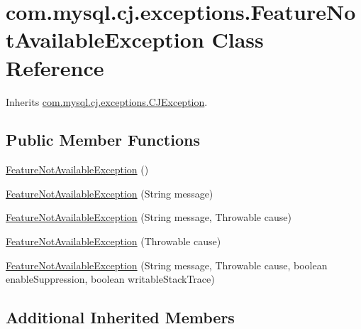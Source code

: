\hypertarget{classcom_1_1mysql_1_1cj_1_1exceptions_1_1_feature_not_available_exception}{}\section{com.\+mysql.\+cj.\+exceptions.\+Feature\+Not\+Available\+Exception Class Reference}
\label{classcom_1_1mysql_1_1cj_1_1exceptions_1_1_feature_not_available_exception}


Inherits \mbox{\hyperlink{classcom_1_1mysql_1_1cj_1_1exceptions_1_1_c_j_exception}{com.\+mysql.\+cj.\+exceptions.\+C\+J\+Exception}}.

\subsection*{Public Member Functions}
\begin{DoxyCompactItemize}
\item 
\mbox{\hyperlink{classcom_1_1mysql_1_1cj_1_1exceptions_1_1_feature_not_available_exception_a450071f14c4816ec589120077d7218d5}{Feature\+Not\+Available\+Exception}} ()
\item 
\mbox{\hyperlink{classcom_1_1mysql_1_1cj_1_1exceptions_1_1_feature_not_available_exception_a31c6386da95ddc2dde257d3c9684e319}{Feature\+Not\+Available\+Exception}} (String message)
\item 
\mbox{\hyperlink{classcom_1_1mysql_1_1cj_1_1exceptions_1_1_feature_not_available_exception_aa3320429365a0798dc27c4e0c70cbab1}{Feature\+Not\+Available\+Exception}} (String message, Throwable cause)
\item 
\mbox{\hyperlink{classcom_1_1mysql_1_1cj_1_1exceptions_1_1_feature_not_available_exception_a6b27bbabb2ac94827ed0196cdb45da28}{Feature\+Not\+Available\+Exception}} (Throwable cause)
\item 
\mbox{\hyperlink{classcom_1_1mysql_1_1cj_1_1exceptions_1_1_feature_not_available_exception_a6c69f78da4907a6a1faf8aad9d6a4d9e}{Feature\+Not\+Available\+Exception}} (String message, Throwable cause, boolean enable\+Suppression, boolean writable\+Stack\+Trace)
\end{DoxyCompactItemize}
\subsection*{Additional Inherited Members}


